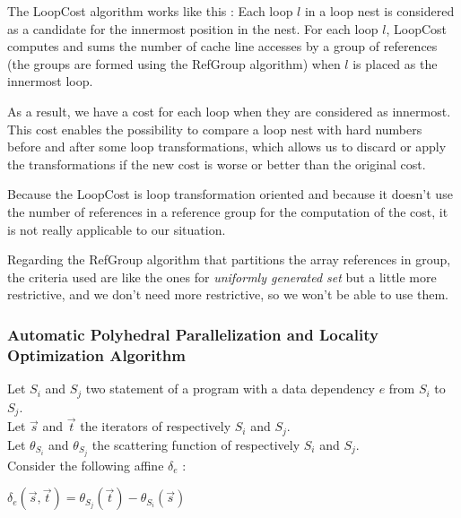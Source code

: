 \documentclass[paper=a4, fontsize=11.5pt]{scrartcl}
\numberwithin{equation}{section}        %
\numberwithin{figure}{section}          %
\numberwithin{table}{section}               %
\begin{document}
            The LoopCost algorithm works like this : 
            Each loop $l$ in a loop nest is considered as a candidate for the innermost
            position in the nest. For each loop $l$, LoopCost computes and sums the number
            of cache line accesses by a group of references (the groups are formed
            using the RefGroup algorithm) when $l$ is placed as the innermost loop.

            As a result, we have a cost for each loop when they are considered as innermost.
            This cost enables the possibility to compare a loop nest with hard numbers 
            before and after some loop transformations, which allows us to discard
            or apply the transformations if the new cost is worse or better than the
            original cost.
            \bigskip

            Because the LoopCost is loop transformation oriented and because it doesn't
            use the number of references in a reference group for the computation
            of the cost, it is not really applicable to our situation.

            Regarding the RefGroup algorithm that partitions the array references
            in group, the criteria used are like the ones for \textit{uniformly generated set}
            but a little more restrictive, and we don't need more restrictive, so we won't
            be able to use them.
            
            
        \subsubsection{Automatic Polyhedral Parallelization and Locality Optimization Algorithm}
        \label{sec:auto_poly_paral}
            Let $S_i$ and $S_j$ two statement of a program with a data dependency $e$
            from $S_i$ to $S_j$.\\
            Let $\vec{s}$ and $\vec{t}$ the iterators of respectively $S_i$ and $S_j$.\\
            Let $\theta_{S_i}$ and $\theta_{S_j}$ the scattering function of respectively $S_i$
            and $S_j$.\\
            Consider the following affine $\delta_e$ :
            \begin{center}
                $\delta_e\left(\vec{s},\vec{t}\right) = \theta_{S_j}\left(\vec{t}\right) - \theta_{S_i}\left(\vec{s}\right)$
            \end{center}
\end{document}
